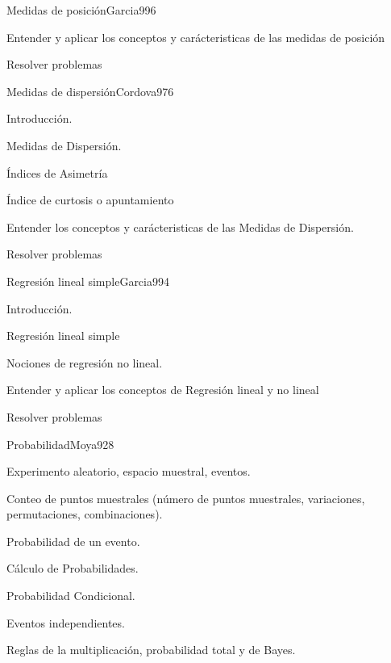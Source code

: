 \begin{syllabus}
\begin{unit}{Medidas de posición}{Garcia99}{6}
   \begin{unitgoals}
         \item  Entender y aplicar los conceptos y carácteristicas de las medidas de posición
         \item  Resolver problemas
   \end{unitgoals}
\end{unit}

\begin{unit}{Medidas de dispersión}{Cordova97}{6}
   \begin{topics}
         \item  Introducción.
	 \item  Medidas de Dispersión.
         \item  Índices de Asimetría
	 \item  Índice de curtosis o apuntamiento
   \end{topics}

   \begin{unitgoals}
         \item  Entender los conceptos y carácteristicas de las Medidas de Dispersión.
         \item  Resolver problemas
   \end{unitgoals}
\end{unit}

\begin{unit}{Regresión lineal simple}{Garcia99}{4}
   \begin{topics}
         \item  Introducción.
	 \item  Regresión lineal simple
         \item  Nociones de regresión no lineal.
   \end{topics}

   \begin{unitgoals}
         \item  Entender y aplicar los conceptos de Regresión lineal y no lineal
         \item  Resolver problemas
   \end{unitgoals}
\end{unit}

\begin{unit}{Probabilidad}{Moya92}{8}
   \begin{topics}
         \item  Experimento aleatorio, espacio muestral, eventos.
	 \item  Conteo de puntos muestrales (número de puntos muestrales, variaciones, permutaciones, combinaciones).
         \item  Probabilidad de un evento.
	 \item  Cálculo de Probabilidades.
	\item Probabilidad Condicional.
	\item Eventos independientes.
	\item Reglas de la multiplicación, probabilidad total y de Bayes.
   \end{topics}


\end{unit}
\end{syllabus}
